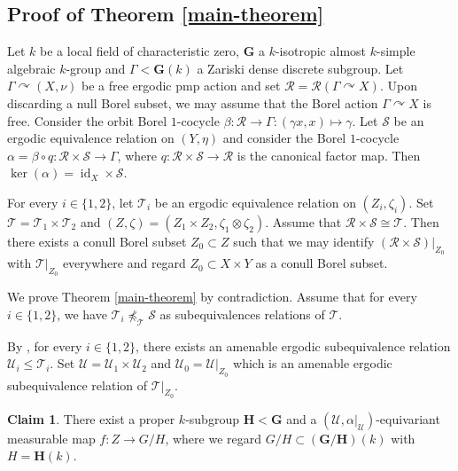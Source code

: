 \documentclass[11pt]{amsart}
\numberwithin{equation}{section}
\theoremstyle{plain}
\theoremstyle{definition}
\newtheorem{claim}[thm]{Claim}
\newcommand{\id}{\operatorname{id}}
\begin{document}
\subsection{Proof of Theorem \ref{main-theorem}}


Let $k$ be a local field of characteristic zero, $\mathbf G$ a $k$-isotropic almost $k$-simple algebraic $k$-group and $\Gamma < \mathbf G(k)$ a Zariski dense discrete subgroup. Let $\Gamma \curvearrowright (X, \nu)$ be a free ergodic pmp action and set $\mathscr R = \mathscr R(\Gamma \curvearrowright X)$. Upon discarding a null Borel subset, we may assume that the Borel action $\Gamma \curvearrowright X$ is free. Consider the orbit Borel $1$-cocycle $\beta : \mathscr R \to \Gamma : (\gamma x, x) \mapsto \gamma$. Let $\mathscr S$ be an ergodic equivalence relation on $(Y, \eta)$ and consider the Borel $1$-cocycle $\alpha = \beta \circ q : \mathscr R \times \mathscr S \to \Gamma$, where $q : \mathscr R \times \mathscr S \to \mathscr R$ is the canonical factor map. Then $\ker(\alpha) = \id_X \times \mathscr S$. 

For every $i \in \{1, 2\}$, let $\mathscr T_i$ be an ergodic equivalence relation on $(Z_i, \zeta_i)$. Set $\mathscr T = \mathscr T_1 \times \mathscr T_2$ and $(Z, \zeta) = (Z_1 \times Z_2, \zeta_1 \otimes \zeta_2)$. Assume that $\mathscr R \times \mathscr S \cong \mathscr T$. Then there exists a conull Borel subset $Z_0 \subset Z$ such that we may identify $(\mathscr R \times \mathscr S)|_{Z_0}$ with $\mathscr T|_{Z_0}$ everywhere and regard $Z_0 \subset X \times Y$ as a conull Borel subset.

We prove Theorem \ref{main-theorem} by contradiction. Assume that for every $i \in \{1, 2\}$, we have $\mathscr T_i \npreceq _{\mathscr T} \mathscr S$ as subequivalences relations of 
$\mathscr T$.

By \cite[Proposition 9.3.2]{Zi84}, for every $i \in \{1, 2\}$, there exists an amenable ergodic subequivalence relation $\mathscr U_i \leq \mathscr T_i$. Set $\mathscr U = \mathscr U_1 \times \mathscr U_2$ and $\mathscr U_0 = \mathscr U|_{Z_0}$ which is an amenable ergodic subequivalence relation of $\mathscr T|_{Z_0}$. 

\begin{claim}\label{claim1}
There exist a proper $k$-subgroup $\mathbf H < \mathbf G$ and a $(\mathscr U, \alpha|_{\mathscr U})$-equivariant measurable map $f : Z \to G/H$, where we regard $G/H \subset (\mathbf G/\mathbf H)(k)$ with $H = \mathbf H(k)$.
\end{claim}
\end{document}
